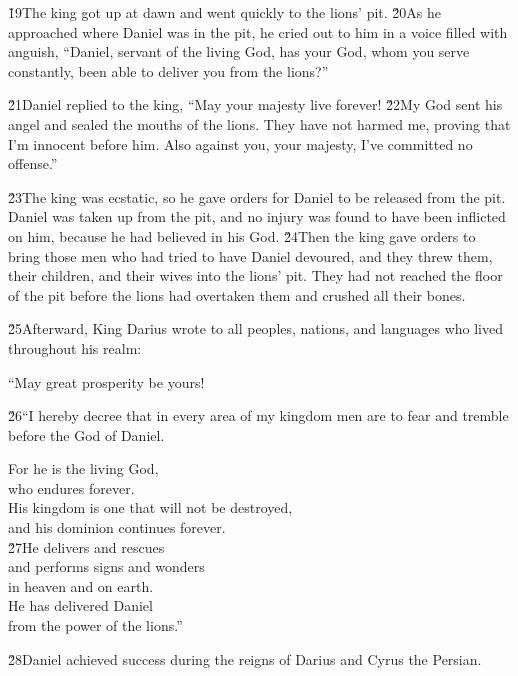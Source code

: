 \v{19}The king got up at dawn and went quickly to the lions' pit. \v{20}As he approached where Daniel was in the pit, he cried out to him in a voice filled with anguish, ``Daniel, servant of the living God, has your God, whom you serve constantly, been able to deliver you from the lions?''

\v{21}Daniel replied to the king, ``May your majesty live forever! \v{22}My God sent his angel and sealed the mouths of the lions. They have not harmed me, proving that I'm innocent before him. Also against you, your majesty, I've committed no offense.''

\v{23}The king was ecstatic, so he gave orders for Daniel to be released from the pit. Daniel was taken up from the pit, and no injury was found to have been inflicted on him, because he had believed in his God. \v{24}Then the king gave orders to bring those men who had tried to have Daniel devoured, and they threw them, their children, and their wives into the lions' pit. They had not reached the floor of the pit before the lions had overtaken them and crushed all their bones.

\v{25}Afterward, King Darius wrote to all peoples, nations, and languages who lived throughout his realm:

``May great prosperity be yours!

\v{26}``I hereby decree that in every area of my kingdom men are to fear and tremble before the God of Daniel.

\begin{poetry}
\poeml For he is the living God, \\
\poemll    who endures forever. \\
\poeml His kingdom is one that will not be destroyed, \\
\poemll    and his dominion continues forever. \\
\poeml \v{27}He delivers and rescues \\
\poemll    and performs signs and wonders \\
\poemlll       in heaven and on earth. \\
\poeml He has delivered Daniel \\
\poemll    from the power of the lions.''
\end{poetry}

\v{28}Daniel achieved success during the reigns of Darius and Cyrus the Persian.

